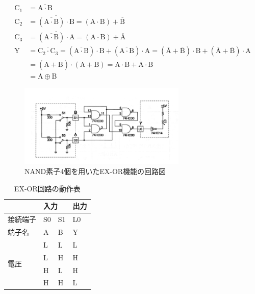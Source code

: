 \documentclass[a4paper, 11pt, uplatex]{jsarticle}
\begin{document}
\begin{align}
  \mathrm{C_1} &= \overline{\mathrm{A} \cdot \mathrm{B}} \\
  \mathrm{C_2} &= \overline{(\overline{\mathrm{A} \cdot \mathrm{B}}) \cdot \mathrm{B}} = (\mathrm{A} \cdot \mathrm{B}) + \overline{\mathrm{B}}\\
  \mathrm{C_3} &= \overline{(\overline{\mathrm{A} \cdot \mathrm{B}}) \cdot \mathrm{A}} = (\mathrm{A} \cdot \mathrm{B}) + \overline{\mathrm{A}}\\
  \mathrm{Y} &= \overline{\mathrm{C_2} \cdot \mathrm{C_3}}
             = (\overline{\mathrm{A} \cdot \mathrm{B}}) \cdot \mathrm{B} + (\overline{\mathrm{A} \cdot \mathrm{B}}) \cdot \mathrm{A}
             = (\overline{\mathrm{A}} + \overline{\mathrm{B}}) \cdot \mathrm{B} + (\overline{\mathrm{A}} + \overline{\mathrm{B}}) \cdot \mathrm{A}\\
             &= (\overline{\mathrm{A}} + \overline{\mathrm{B}}) \cdot (\mathrm{A} + \mathrm{B}) = \mathrm{A} \cdot \overline{\mathrm{B}} + \overline{\mathrm{A}} \cdot  \mathrm{B} \\
             &= \mathrm{A} \oplus \mathrm{B}
\end{align}


\begin{figure}[H]
  \begin{center}
    \includegraphics[width = 8cm]{画像/EX-OR.png}
    \caption{NAND素子4個を用いたEX-OR機能の回路図}
    \label{EX-OR}
  \end{center}
\end{figure}

\begin{table}[H]
  \begin{center}
  \caption{EX-OR回路の動作表}
  \label{EX-OR動作表}
\begin{tabular}{|l|l|l|l|}
\hline
                    & \multicolumn{2}{l|}{入力} & 出力 \\ \hline
接続端子               & S0         & S1         & L0 \\ \hline
端子名                 & A          & B          & Y  \\ \hline \hline
\multirow{4}{*}{電圧} & L          & L          & L  \\
                     & L          & H          & H  \\
                     & H          & L          & H  \\
                     & H          & H          & L  \\ \hline
\end{tabular}
\end{center}
\end{table}
\end{document}
